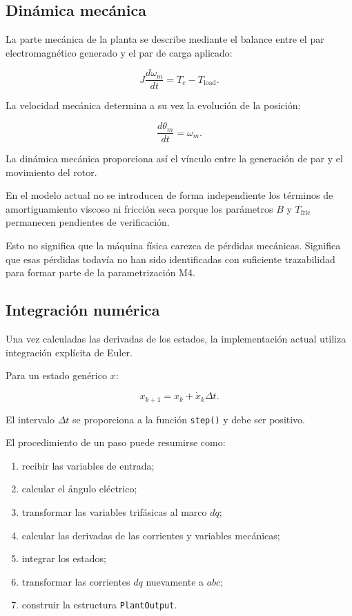\subsection{Dinámica mecánica}

La parte mecánica de la planta se describe mediante el balance entre el par electromagnético generado y el par de carga aplicado:

\begin{equation}
J\frac{d\omega_m}{dt}
=
T_e-T_{\mathrm{load}}.
\end{equation}

La velocidad mecánica determina a su vez la evolución de la posición:

\begin{equation}
\frac{d\theta_m}{dt}
=
\omega_m.
\end{equation}

La dinámica mecánica proporciona así el vínculo entre la generación de par y el movimiento del rotor.

En el modelo actual no se introducen de forma independiente los términos de amortiguamiento viscoso ni fricción seca porque los parámetros $B$ y $T_{\mathrm{fric}}$ permanecen pendientes de verificación.

Esto no significa que la máquina física carezca de pérdidas mecánicas. Significa que esas pérdidas todavía no han sido identificadas con suficiente trazabilidad para formar parte de la parametrización M4.

\subsection{Integración numérica}

Una vez calculadas las derivadas de los estados, la implementación actual utiliza integración explícita de Euler.

Para un estado genérico $x$:

\begin{equation}
x_{k+1}
=
x_k+
\dot{x}_k\Delta t.
\end{equation}

El intervalo $\Delta t$ se proporciona a la función \texttt{step()} y debe ser positivo.

El procedimiento de un paso puede resumirse como:

\begin{enumerate}
\item recibir las variables de entrada;
\item calcular el ángulo eléctrico;
\item transformar las variables trifásicas al marco $dq$;
\item calcular las derivadas de las corrientes y variables mecánicas;
\item integrar los estados;
\item transformar las corrientes $dq$ nuevamente a $abc$;
\item construir la estructura \texttt{PlantOutput}.
\end{enumerate}

